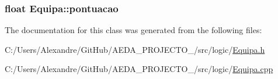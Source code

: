 \subsubsection[{pontuacao}]{\setlength{\rightskip}{0pt plus 5cm}float Equipa\+::pontuacao\hspace{0.3cm}{\ttfamily [private]}}\label{class_equipa_a1b047e8ef3d73dd54b656af9dbfcf9ae}


The documentation for this class was generated from the following files\+:\begin{DoxyCompactItemize}
\item 
C\+:/\+Users/\+Alexandre/\+Git\+Hub/\+A\+E\+D\+A\+\_\+\+P\+R\+O\+J\+E\+C\+T\+O\+\_/src/logic/\hyperlink{_equipa_8h}{Equipa.\+h}\item 
C\+:/\+Users/\+Alexandre/\+Git\+Hub/\+A\+E\+D\+A\+\_\+\+P\+R\+O\+J\+E\+C\+T\+O\+\_/src/logic/\hyperlink{_equipa_8cpp}{Equipa.\+cpp}\end{DoxyCompactItemize}
